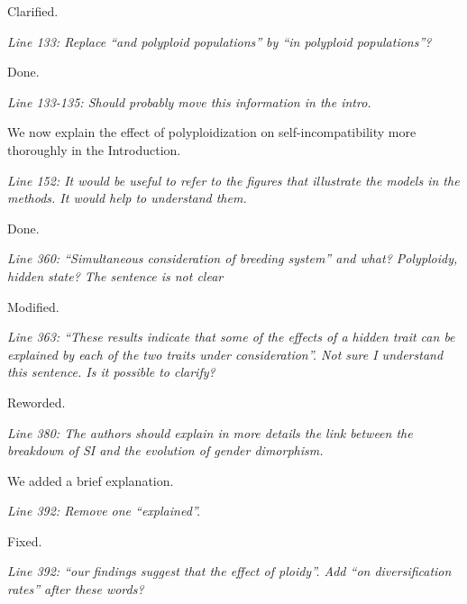 \documentclass[11pt]{article}
\renewenvironment{quote}{\bigskip\noindent\itshape\ignorespaces}{\smallskip}
\begin{document}
Clarified.


\begin{quote}
Line 133: Replace ``and polyploid populations'' by ``in polyploid populations''?
\end{quote}

Done.


\begin{quote}
Line 133-135: Should probably move this information in the intro.
\end{quote}

We now explain the effect of polyploidization on self-incompatibility more thoroughly in the Introduction.


\begin{quote}
Line 152: It would be useful to refer to the figures that illustrate the models in the methods.
It would help to understand them.
\end{quote}

Done. %


\begin{quote}
Line 360: ``Simultaneous consideration of breeding system'' and what?
Polyploidy, hidden state?
The sentence is not clear
\end{quote}

Modified.


\begin{quote}
Line 363: ``These results indicate that some of the effects of a hidden trait can be explained by each of the two traits under consideration''.
Not sure I understand this sentence. Is it possible to clarify?
\end{quote}

Reworded.


\begin{quote}
Line 380: The authors should explain in more details the link between the breakdown of SI and the evolution of gender dimorphism.
\end{quote}

We added a brief explanation.


\begin{quote}
Line 392: Remove one ``explained''.
\end{quote}

Fixed.


\begin{quote}
Line 392: ``our findings suggest that the effect of ploidy''.
Add ``on diversification rates'' after these words?
\end{quote}
\end{document}
